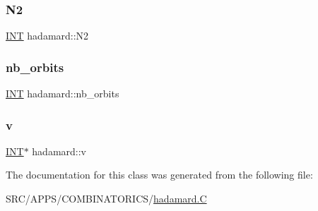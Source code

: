 \subsubsection{\texorpdfstring{N2}{N2}}
{\footnotesize\ttfamily \mbox{\hyperlink{galois_8h_a09fddde158a3a20bd2dcadb609de11dc}{I\+NT}} hadamard\+::\+N2}

\mbox{\label{classhadamard_aed9bff4bb7390e22d6f3c0001773fa55}} 
\subsubsection{\texorpdfstring{nb\+\_\+orbits}{nb\_orbits}}
{\footnotesize\ttfamily \mbox{\hyperlink{galois_8h_a09fddde158a3a20bd2dcadb609de11dc}{I\+NT}} hadamard\+::nb\+\_\+orbits}

\mbox{\label{classhadamard_a057eb008b50219f72710c974a53d08c3}} 
\subsubsection{\texorpdfstring{v}{v}}
{\footnotesize\ttfamily \mbox{\hyperlink{galois_8h_a09fddde158a3a20bd2dcadb609de11dc}{I\+NT}}$\ast$ hadamard\+::v}



The documentation for this class was generated from the following file\+:\begin{DoxyCompactItemize}
\item 
S\+R\+C/\+A\+P\+P\+S/\+C\+O\+M\+B\+I\+N\+A\+T\+O\+R\+I\+C\+S/\mbox{\hyperlink{hadamard_8_c}{hadamard.\+C}}\end{DoxyCompactItemize}
